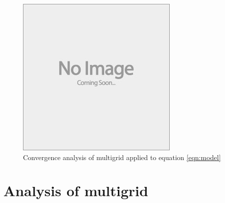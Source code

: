 \begin{figure}[h]
	\centering
	\includegraphics[draft]{images/placeholder}
	\caption{Convergence analysis of multigrid applied to equation \eqref{eqn:model}}
\end{figure}







\section{Analysis of multigrid}



